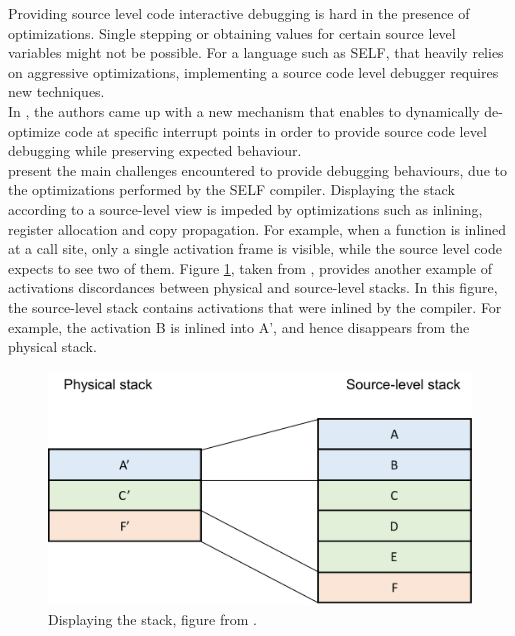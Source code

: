 Providing source level code interactive debugging is hard in the presence of optimizations.
Single stepping or obtaining values for certain source level variables might not be possible.
For a language such as SELF, that heavily relies on aggressive optimizations, implementing a source code level debugger requires new techniques.\\

In \cite{holzle1992debugging}, the authors came up with a new mechanism that enables to dynamically de-optimize code at specific interrupt points in order to provide source code level debugging while preserving expected behaviour.\\

 present the main challenges encountered to provide debugging behaviours, due to the optimizations performed by the SELF compiler. 
Displaying the stack according to a source-level view is impeded by optimizations such as inlining, register allocation and copy propagation.
For example, when a function is inlined at a call site, only a single activation frame is visible, while the source level code expects to see two of them.
Figure \ref{stackframes}, taken from \cite{holzle1992debugging}, provides another example of activations discordances between physical and source-level stacks.
In this figure, the source-level stack contains activations that were inlined by the compiler. For example, the activation B is inlined into A', and hence disappears from the physical stack.\\
\begin{figure}[h]
\centering
\includegraphics[scale=0.5]{Figures/Figure1}
\decoRule
\caption[physical vs. source-level stacks]{Displaying the stack, figure from \cite{holzle1992debugging}.}
\label{stackframes}
\end{figure}

